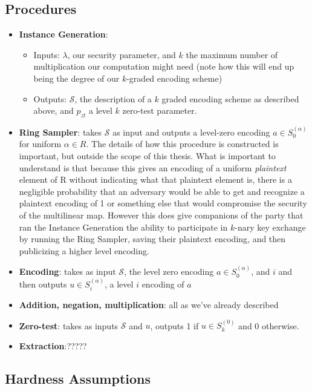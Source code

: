 \documentclass[12pt,twoside]{reedthesis}
\begin{document}
    
    
    \subsection{Procedures}
    \begin{itemize}
    \item \textbf{Instance Generation}: 
    	\begin{itemize}
    \item Inputs: $\lambda$, our security parameter, and $k$ the maximum number of multiplication our computation might need (note how this will end up being the degree of our $k$-graded encoding scheme)  
    \item Outputs: $\mathcal{S}$, the description of a $k$ graded encoding scheme as described above, and $p_{zt}$ a level $k$ zero-test parameter.
    	\end{itemize}  
	\item \textbf{Ring Sampler}: takes $\mathcal{S}$ as input and outputs a level-zero encoding $a \in S_0^{(\alpha)}$ for uniform $\alpha \in R$. The details of how this procedure is constructed is important, but outside the scope of this thesis. What is important to understand is that because this gives an encoding of a uniform \textit{plaintext} element of R without  indicating what that plaintext element is, there is a negligible probability that an adversary would be able to get and recognize a plaintext encoding of 1 or something else that would compromise the security of the multilinear map. However this does give companions of the party that ran the Instance Generation the ability to participate in $k$-nary key exchange by running the Ring Sampler, saving their plaintext encoding, and then publicizing a higher level encoding.
	\item \textbf{Encoding}: takes as input $\mathcal{S}$, the level zero encoding $a\in S_0^{(\alpha)}$, and $i$ and then outputs $u\in S_i^{(\alpha)}$, a level $i$ encoding of $a$
	\item \textbf{Addition, negation, multiplication}: all as we've already described
	\item \textbf{Zero-test}: takes as inputs $\mathcal{S}$ and $u$, outputs 1 if $u \in S_k^{(0)}$ and 0 otherwise. 
	\item \textbf{Extraction}:?????
    \end{itemize}
    
    \subsection{Hardness Assumptions}
    
\end{document}
